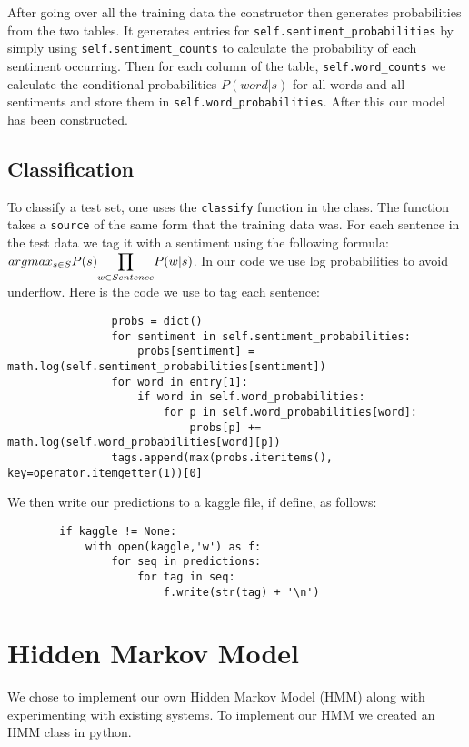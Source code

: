 \documentclass{article}
\begin{document}
After going over all the training data the constructor then generates probabilities from the two tables. It generates entries for \texttt{self.sentiment\_probabilities} by simply using \texttt{self.sentiment\_counts} to calculate the probability of each sentiment occurring. Then for each column of the table, \texttt{self.word\_counts} we calculate the conditional probabilities $P(word|s)$ for all words and all sentiments and store them in \texttt{self.word\_probabilities}. After this our model has been constructed.

\subsection{Classification}

To classify a test set, one uses the \texttt{classify} function in the class. The function takes a \texttt{source} of the same form that the training data was. For each sentence in the test data we tag it with a sentiment using the following formula: $argmax_{s\in S}P(s)\mathlarger{\prod}_{w\in Sentence} P(w|s)$. In our code we use log probabilities to avoid underflow. Here is the code we use to tag each sentence:

\begin{verbatim}
                probs = dict()
                for sentiment in self.sentiment_probabilities:
                    probs[sentiment] = math.log(self.sentiment_probabilities[sentiment])
                for word in entry[1]:
                    if word in self.word_probabilities:
                        for p in self.word_probabilities[word]:
                            probs[p] += math.log(self.word_probabilities[word][p])
                tags.append(max(probs.iteritems(), key=operator.itemgetter(1))[0]
\end{verbatim}

We then write our predictions to a kaggle file, if define, as follows:
\begin{verbatim}
        if kaggle != None:
            with open(kaggle,'w') as f:
                for seq in predictions:
                    for tag in seq:
                        f.write(str(tag) + '\n')
\end{verbatim}
\section{Hidden Markov Model}

We chose to implement our own Hidden Markov Model (HMM) along with experimenting with existing systems. To implement our HMM we created an HMM class in python.
\end{document}
